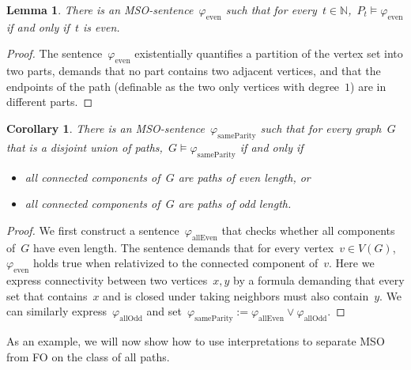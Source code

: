 \documentclass[11pt]{article}      \usepackage[margin=1in]{geometry}  \usepackage{microtype}
\newtheorem{corollary}[theorem]{Corollary}
\newtheorem{lemma}[theorem]{Lemma}
\theoremstyle{definition}
\newcommand{\N}[0]{\mathrm{\mathbb{N}}}
\renewcommand{\phi}{\varphi}
\begin{document}
\newcommand{\even}{\phi_{\mathrm{even}}}
\newcommand{\sameparity}{\phi_{\mathrm{sameParity}}}

\begin{lemma}\label{lem:even}
    There is an MSO-sentence~$\even$ such that for every~$t \in \N$,~$P_t\models \even$ if and only if~$t$ is even.
\end{lemma}
\begin{proof}
    The sentence~$\even$ existentially quantifies a partition of the vertex set into two parts, demands that no part contains two adjacent vertices, and that the endpoints of the path (definable as the two only vertices with degree~$1$) are in different parts.
\end{proof}

\begin{corollary}\label{lem:same-parity}
    There is an MSO-sentence~$\sameparity$ such that for every graph~$G$ that is a disjoint union of paths,~$G \models \sameparity$ if and only if
    \begin{itemize}
        \item all connected components of~$G$ are paths of even length, or 
        \item all connected components of~$G$ are paths of odd length.
    \end{itemize}
\end{corollary}
\begin{proof}
    We first construct a sentence~$\phi_{\mathrm{allEven}}$ that checks whether all components of~$G$ have even length.
    The sentence demands that for every vertex~$v\in V(G)$,~$\even$ holds true when relativized to the connected component of~$v$.
    Here we express connectivity between two vertices~$x,y$ by a formula demanding that every set that contains~$x$ and is closed under taking neighbors must also contain~$y$.
    We can similarly express~$\phi_{\mathrm{allOdd}}$ and set~$\sameparity := \phi_{\mathrm{allEven}} \vee \phi_{\mathrm{allOdd}}$.
\end{proof}

As an example, we will now show how to use interpretations to separate MSO from FO on the class of all paths.
\end{document}
